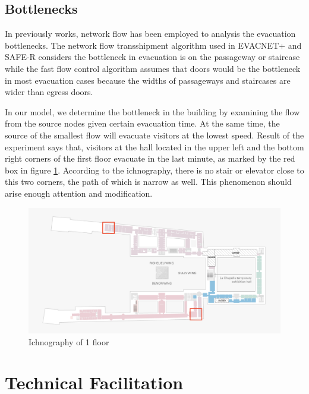 \documentclass{mcmthesis}
\begin{document}
\subsection{Bottlenecks}
 In previously works, network flow has been employed to analysis the evacuation bottlenecks. The network flow transshipment algorithm \cite{white1972dynamic} used in EVACNET+ and SAFE-R considers the bottleneck in evacuation is on the passageway or staircase while the fast flow control algorithm \cite{chen2009fast} assumes that doors would be the bottleneck in most evacuation cases because the widths of passageways and staircases are wider than egress doors. 

In our model, we determine the bottleneck in the building by examining the  flow  from the source nodes given certain evacuation time. At the same time, the source of the smallest flow will evacuate visitors at the lowest speed.
Result of the experiment says that, visitors at the hall located in the upper left and the bottom right corners of the first floor evacuate in the last minute, as marked by the red box in figure \ref{fig:screenshot007}. According to the ichnography, there is no stair or elevator close to this two corners, the path of which is narrow as well. This phenomenon should arise enough attention and modification.

\begin{figure}
	\centering
	\includegraphics[width=0.7\linewidth]{../../Figure/screenshot007}
	\caption{Ichnography of 1 floor}
	\label{fig:screenshot007}
\end{figure}


\section{Technical Facilitation}
\end{document}
